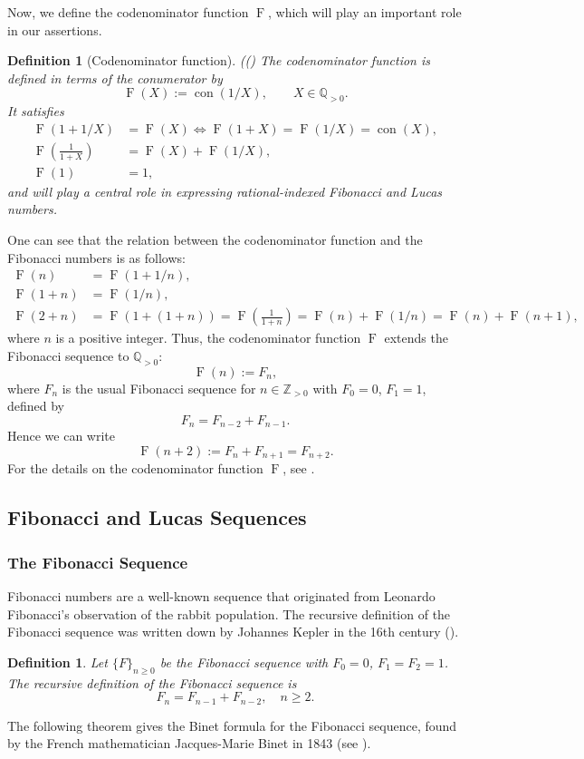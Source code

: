 \documentclass[10pt,a4paper]{amsart}
\numberwithin{equation}{section}
\numberwithin{table}{section}
\numberwithin{figure}{section}
\DeclareMathOperator{\con}{con}
\DeclareMathOperator{\F}{F}
\newtheorem{definition}[thm]{Definition}
\begin{document}
Now, we define the codenominator function $\F$, which will play an important role in our assertions.\begin{definition}[Codenominator function]{\normalfont((\cite{ULUDAG2022103192})}	The \emph{codenominator function} is defined in terms of the conumerator by	\begin{equation}		\F(X) := \con(1/X), \qquad X\in \mathbb{Q}_{>0}.	\end{equation}	It satisfies 	\begin{align}		\F(1+1/X) &= \F(X) \iff \F(1+X) = \F(1/X) = \con(X),\label{F:1}\\		\F\!\left(\tfrac{1}{1+X}\right) &= \F(X) + \F(1/X),\label{F:2}\\		\F(1)& = 1,	\end{align}	and will play a central role in expressing rational-indexed Fibonacci and Lucas numbers.\end{definition}One can see that the relation between the codenominator function and the Fibonacci numbers is as follows:\begin{align}	\F(n)& = \F(1+1/n),\\	\F(1+n) & = \F(1/n),\\	\F(2+n) &= \F(1+(1+n)) =\F\!\left(\tfrac{1}{1+n}\right) = \F(n) + \F(1/n) = \F(n) + \F(n+1),\end{align}where $n$ is a positive integer. Thus, the codenominator function $\F$ extends the Fibonacci sequence to $\mathbb{Q}_{>0}$:\begin{equation}	\F(n) := F_n,\end{equation}where $F_n$ is the usual Fibonacci sequence for $n \in \mathbb{Z}_{>0}$ with $F_0 = 0$, $F_1=1$, defined by\begin{equation}	F_{n} = F_{n-2} + F_{n-1}.\end{equation}Hence we can write\begin{equation}	\F(n+2) := F_n + F_{n+1} = F_{n+2}.\end{equation}For the details on the codenominator function $\F$, see \cite{ULUDAG2022103192}.\subsection{Fibonacci and Lucas Sequences}\subsubsection{The Fibonacci Sequence}Fibonacci numbers are a well-known sequence that originated from Leonardo Fibonacci's observation of the rabbit population. The recursive definition of the Fibonacci sequence was written down by Johannes Kepler in the 16th century (\cite{koshy2017fibonacci}).\begin{definition}	Let $\{F\}_{n\geq 0}$ be the Fibonacci sequence with $F_0 = 0$, $F_1 = F_2 = 1$. The recursive definition of the Fibonacci sequence is	\begin{equation}		F_n = F_{n-1} + F_{n-2}, \quad n\geq 2.	\end{equation}\end{definition}The following theorem gives the Binet formula for the Fibonacci sequence, found by the French mathematician Jacques-Marie Binet in 1843 (see \cite[p.~90]{koshy2019fibonacci}).
\end{document}
